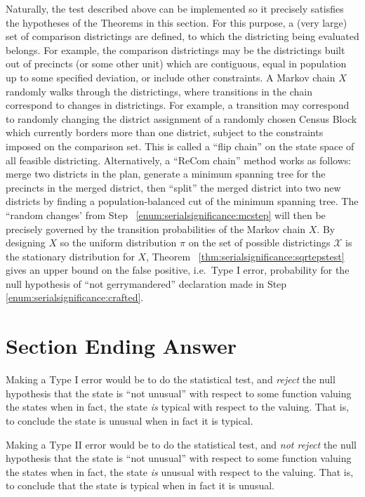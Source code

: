 \documentclass[12pt]{article}
\begin{document}
Naturally, the test described above can be implemented so it precisely
satisfies the hypotheses of the Theorems in this section.  For this
purpose, a (very large) set of comparison districtings are defined, to
which the districting being evaluated belongs.  For example, the
comparison districtings may be the districtings built out of precincts (or
some other unit) which are contiguous, equal in population up to some
specified deviation, or include other constraints.  A Markov chain \( X \)
randomly walks through the districtings, where transitions in the chain
correspond to changes in districtings.  For example, a transition may
correspond to randomly changing the district assignment of a randomly
chosen Census Block which currently borders more than one district,
subject to the constraints imposed on the comparison set.  This is
called a ``flip chain'' on the state space of all feasible districting.
Alternatively, a ``ReCom chain'' method works as follows:  merge two
districts in the plan, generate a minimum spanning tree for the
precincts in the merged district, then ``split'' the merged district
into two new districts by finding a population-balanced cut of the
minimum spanning tree.  The ``random changes' from Step~%
\ref{enum:serialsignificance:mcstep} will then be precisely governed by
the transition probabilities of the Markov chain \( X \).  By designing \(
X \) so the uniform distribution \( \pi \) on the set of possible
districtings \( \mathcal{X} \) is the stationary distribution for \( X \),
Theorem~%
\ref{thm:serialsignificance:sqrtepstest} gives an upper bound on the
false positive, i.e.\ Type I error, probability for the null hypothesis
of ``not gerrymandered'' declaration made in Step~%
\ref{enum:serialsignificance:crafted}.

\section*{Section Ending Answer}

Making a Type I error would be to do the statistical test, and \emph{reject}
the null hypothesis that the state is ``not unusual'' with respect to
some function valuing the states when in fact, the state \emph{is}
typical with respect to the valuing.  That is, to conclude the state
is unusual when in fact it is typical.

Making a Type II error would be to do the statistical test, and \emph{not
reject} the null hypothesis that the state is ``not unusual'' with
respect to some function valuing the states when in fact, the state
\emph{is} unusual with respect to the valuing.  That is, to conclude
that the state is typical when in fact it is unusual.
\end{document}
